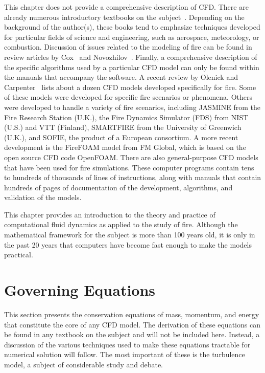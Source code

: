 \documentclass[graybox]{svmult}
\begin{document}
This chapter does not provide a comprehensive description of CFD. There are already numerous introductory textbooks on the subject~\cite{Anderson, Ferziger, Patankar, Peyret, Versteeg}. Depending on the background of the author(s), these books tend to emphasize techniques developed for particular fields of science and engineering, such as aerospace, meteorology, or combustion. Discussion of issues related to the modeling of fire can be found in review articles by Cox~\cite{Cox:1995,Cox:1998}  and Novozhilov~\cite{Novozhilov}. Finally, a comprehensive description of the specific algorithms used by a particular CFD model can only be found within the manuals that accompany the software. A recent review by Olenick and Carpenter~\cite{Olenick} lists about a dozen CFD models developed specifically for fire. Some of these models were developed for specific fire scenarios or phenomena. Others were developed to handle a variety of fire scenarios, including JASMINE from the Fire Research Station (U.K.), the Fire Dynamics Simulator (FDS) from NIST (U.S.) and VTT (Finland), SMARTFIRE from the University of Greenwich (U.K.), and SOFIE, the product of a European consortium. A more recent development is the FireFOAM model from FM Global, which is based on the open source CFD code OpenFOAM. There are also general-purpose CFD models that have been used for fire simulations. These computer programs contain tens to hundreds of thousands of lines of instructions, along with manuals that contain hundreds of pages of documentation of the development, algorithms, and validation of the models.

This chapter provides an introduction to the theory and practice of computational fluid dynamics as applied to the study of fire. Although the mathematical framework for the subject is more than 100 years old, it is only in the past 20 years that computers have become fast enough to make the models practical.


\section{Governing Equations}

This section presents the conservation equations of mass, momentum, and energy that constitute the core of any CFD model. The derivation of these equations can be found in any textbook on the subject and will not be included here. Instead, a discussion of the various techniques used to make these equations tractable for numerical solution will follow. The most important of these is the turbulence model, a subject of considerable study and debate.
\end{document}
